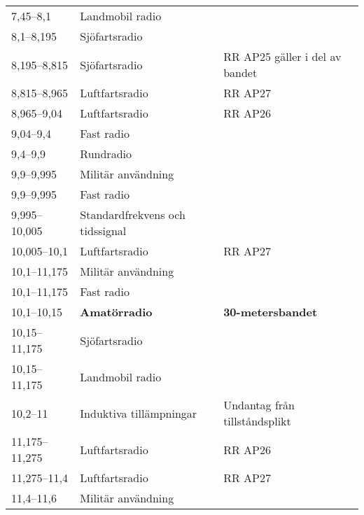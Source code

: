 \begin{landscape}
\begin{longtable}{lll}
7,45--8,1         & Landmobil radio                  &                                 \\
8,1--8,195        & Sjöfartsradio                    &                                 \\
8,195--8,815      & Sjöfartsradio                    & RR AP25 gäller i del av bandet  \\
8,815--8,965      & Luftfartsradio                   & RR AP27                         \\
8,965--9,04       & Luftfartsradio                   & RR AP26                         \\
9,04--9,4         & Fast radio                       &                                 \\
9,4--9,9          & Rundradio                        &                                 \\
9,9--9,995        & Militär användning               &                                 \\
9,9--9,995        & Fast radio                       &                                 \\
9,995--10,005     & Standardfrekvens och tidssignal  &                                 \\
10,005--10,1      & Luftfartsradio                   & RR AP27                         \\
10,1--11,175      & Militär användning               &                                 \\
10,1--11,175      & Fast radio                       &                                 \\
10,1--10,15       & \textbf{Amatörradio}             & \textbf{30-metersbandet}        \\
10,15--11,175     & Sjöfartsradio                    &                                 \\
10,15--11,175     & Landmobil radio                  &                                 \\
10,2--11          & Induktiva tillämpningar          & Undantag från tillståndsplikt   \\
11,175--11,275    & Luftfartsradio                   & RR AP26                         \\
11,275--11,4      & Luftfartsradio                   & RR AP27                         \\
11,4--11,6        & Militär användning               &                                 \\

\end{longtable}
\end{landscape}
